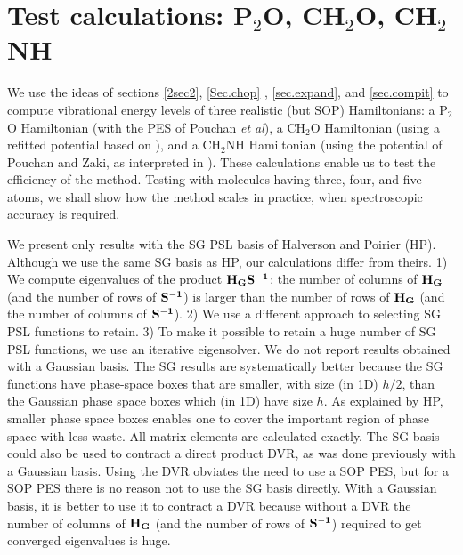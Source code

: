 \section{Test calculations: P$_2$O, CH$_2$O, CH$_2$NH  }   
We  use  the ideas of sections \ref{2sec2}, \ref{Sec.chop} , \ref{sec.expand},  and \ref{sec.compit}     
to compute vibrational energy levels of three realistic (but SOP) Hamiltonians:   a 
 P$_2$O Hamiltonian  (with the PES    of Pouchan \emph{et al}\cite{Pouchan2001}), a CH$_2$O  Hamiltonian   (using a refitted 
potential  based on  ),
%
 and  a  CH$_2$NH    Hamiltonian    (using the potential of 
Pouchan and Zaki\cite{Pouchan1997}, as interpreted in ).  These calculations enable us  to test the efficiency of the method.
Testing with    molecules having  three, four, and five atoms, 
we shall  show how the method scales in practice,  when spectroscopic accuracy is 
required.  



We present only results with the SG PSL basis of Halverson and Poirier (HP).    
Although we use the same SG basis as HP,  our calculations differ from theirs.    1) We compute eigenvalues of the product   ${\bf{H_G S^{-1}}}$; the number of
columns of  ${\bf{H_G }}$ (and the number of rows of  ${\bf{ S^{-1}}}$) is larger than the number of rows of  ${\bf{H_G }}$ (and the number of columns of  ${\bf{ S^{-1}}}$).
2)   We use a different approach to selecting SG PSL functions to retain.
3) To make it possible to retain a huge number of    SG PSL functions, we use an iterative eigensolver.   
%
We do not report results obtained with a Gaussian basis.   The SG results are systematically better because   
the SG  functions have phase-space boxes that are 
smaller, with size (in 1D)  $h/2$,   than the Gaussian phase space boxes which (in 1D) have size    $h$. 
As explained by HP,  smaller phase space boxes  enables one to cover the important region of phase space with less waste.
All matrix elements are calculated exactly.   
The SG basis  could also be used to contract a direct product DVR, as was done previously with a Gaussian basis.
\cite{Shimshovitz2012,Brown2015,Brown2015b,Shimshovitz2012,Shimshovitz2014}
Using the DVR obviates the need to use a SOP PES, but for a SOP PES there is no reason not to use the SG  basis directly.   
With a Gaussian basis, it is better to use it to contract a DVR because without a DVR  the number of  
  columns of  ${\bf{H_G }}$ (and the number of rows of  ${\bf{ S^{-1}}}$) required to get converged eigenvalues is huge.   












